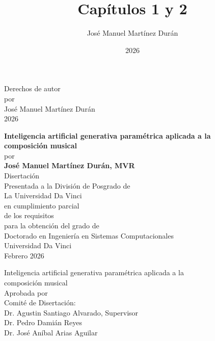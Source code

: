 \documentclass[12pt]{report}
\title{Capítulos 1 y 2}
\author{José Manuel Martínez Durán}
\date{2026}
\begin{document}
\newpage
\thispagestyle{empty}
\vspace*{\fill}
\begin{center}
\doublespacing
Derechos de autor \\
por \\
José Manuel Martínez Durán \\
2026
\end{center}
\vspace*{\fill}
\newpage

\thispagestyle{empty}
\mbox{}
\newpage

\thispagestyle{empty}
\begin{center}
\doublespacing
\textbf{Inteligencia artificial generativa paramétrica aplicada a la \\ composición musical} \\
\vspace{1em}
por \\
\vspace{1em}
\textbf{José Manuel Martínez Durán, MVR} \\
\vspace{2em}
Disertación \\
Presentada a la División de Posgrado de \\
La Universidad Da Vinci \\
en cumplimiento parcial \\
de los requisitos \\
para la obtención del grado de \\
Doctorado en Ingeniería en Sistemas Computacionales \\
\vspace{2em}
Universidad Da Vinci \\
Febrero 2026
\end{center}
\vspace*{\fill}
\newpage

\thispagestyle{empty}
\begin{center}
\doublespacing
Inteligencia artificial generativa paramétrica aplicada a la \\ composición musical \\
\vspace{2em}
Aprobada por \\
Comité de Disertación: \\
\vspace{1em}
Dr. Agustin Santiago Alvarado, Supervisor \\
Dr. Pedro Damián Reyes \\
Dr. José Aníbal Arias Aguilar
\end{center}
\newpage
\end{document}
